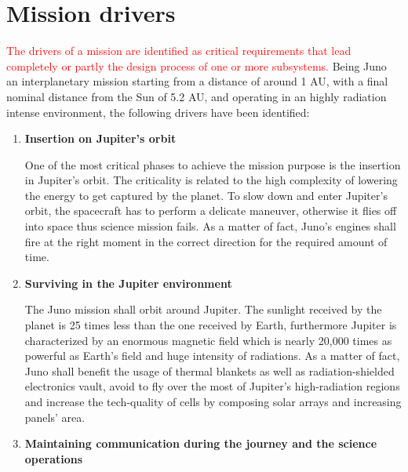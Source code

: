 \section{Mission drivers}
\label{sec:drivers}

\textcolor{red}{The drivers of a mission are identified as critical requirements that lead completely or partly the design process of one or more subsystems.} Being Juno an interplanetary mission starting from a distance of around 1 AU, with a final nominal distance from the Sun of 5.2 AU, and operating in an highly radiation intense environment, the following drivers have been identified: 

\begin{enumerate}
    \color{red}
    \item \textbf{Insertion on Jupiter’s orbit} \cite{fact_sheet} \cite{video_1h} \cite{Juno_launch} \cite{Key_requirements} 
    
    One of the most critical phases to achieve the mission purpose is the insertion in Jupiter’s orbit. The criticality is related to the high complexity of lowering the energy to get captured by the planet. To slow down and enter Jupiter’s orbit, the spacecraft has to perform a delicate maneuver, otherwise it flies off into space thus science mission fails. As a matter of fact, Juno’s engines shall fire at the right moment in the correct direction for the required amount of time. 

    \item \textbf{Surviving in the Jupiter environment} \cite{fact_sheet} \cite{2006_overview} \cite{atmosphere}
    
    The Juno mission shall orbit around Jupiter. The sunlight received by the planet is 25 times less than the one received by Earth, furthermore Jupiter is characterized by an enormous magnetic field which is nearly 20,000 times as powerful as Earth’s field and huge intensity of radiations. As a matter of fact, Juno shall benefit the usage of thermal blankets as well as radiation-shielded electronics vault, avoid to fly over the most of Jupiter’s high-radiation regions and increase the tech-quality of cells by composing solar arrays and increasing panels’ area.
   
    \item \textbf{Maintaining communication during the journey and the science operations}\cite{Juno_launch}\cite{communication_support}
    

\end{enumerate}
